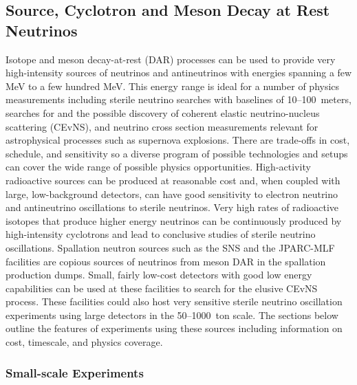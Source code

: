 \subsection{Source, Cyclotron and Meson Decay at Rest Neutrinos}
\label{sec:SourceCyclotronDAR}

Isotope and meson decay-at-rest (DAR) processes can be used to provide
very high-intensity sources of neutrinos and antineutrinos with
energies spanning a few MeV to a few hundred MeV. This energy range
is ideal for a number of physics measurements including sterile
neutrino searches with baselines of 10--100~meters, searches for and
the possible discovery of coherent elastic neutrino-nucleus
scattering (CEvNS), and neutrino cross section measurements relevant
for astrophysical processes such as supernova explosions. There are
trade-offs in cost, schedule, and sensitivity so a diverse program of
possible technologies and setups can cover the wide range of possible
physics opportunities. High-activity radioactive sources can be
produced at reasonable cost and, when coupled with large,
low-background detectors, can have good sensitivity to electron
neutrino and antineutrino oscillations to sterile neutrinos. Very high
rates of radioactive isotopes that produce higher energy neutrinos can
be continuously produced by high-intensity cyclotrons and lead to
conclusive studies of sterile neutrino oscillations. Spallation
neutron sources such as the SNS and the JPARC-MLF facilities are
copious sources of neutrinos from meson DAR in the spallation
production dumps. Small, fairly low-cost detectors with good low
energy capabilities can be used at these facilities to search for
the elusive CEvNS process. These facilities could also host very
sensitive sterile neutrino oscillation experiments using large
detectors in the 50--1000~ton scale. The sections below outline the
features of experiments using these sources including
information on cost, timescale, and physics coverage.

\subsubsection{Small-scale Experiments}


